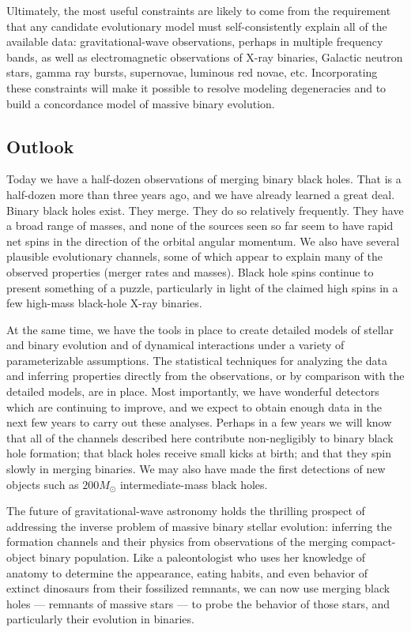 \documentclass[iop,onecolumn]{revtex4-1}
\begin{document}
Ultimately, the most useful constraints are likely to come from the requirement that any candidate evolutionary model must self-consistently explain all of the available data: gravitational-wave observations, perhaps in multiple frequency bands, as well as electromagnetic observations of X-ray binaries, Galactic neutron stars, gamma ray bursts, supernovae, luminous red novae, etc. Incorporating these constraints will make it possible to resolve modeling degeneracies and to build a concordance model of massive binary evolution.  

\subsection{Outlook}

Today we have a half-dozen observations of merging binary black holes.  That is a half-dozen more than three years ago, and we have already learned a great deal.  Binary black holes exist. They merge. They do so relatively frequently.  They have a broad range of masses, and none of the sources seen so far seem to have rapid net spins in the direction of the orbital angular momentum.  We also have several plausible evolutionary channels, some of which appear to explain many of the observed properties (merger rates and masses). Black hole spins continue to present something of a puzzle, particularly in light of the claimed high spins in a few high-mass black-hole X-ray binaries.

At the same time, we have the tools in place to create detailed models of stellar and binary evolution and of dynamical interactions under a variety of parameterizable assumptions.  The statistical techniques for analyzing the data and inferring properties directly from the observations, or by comparison with the detailed models, are in place.  Most importantly, we have wonderful detectors which are continuing to improve, and we expect to obtain enough data in the next few years to carry out these analyses.  Perhaps in a few years we will know that all of the channels described here contribute non-negligibly to binary black hole formation; that black holes receive small kicks at birth; and that they spin slowly in merging binaries. We may also have made the first detections of new objects such as $200 M_\odot$ intermediate-mass black holes.

The future of gravitational-wave astronomy holds the thrilling prospect of addressing the inverse problem of massive binary stellar evolution: inferring the formation channels and their physics from observations of the merging compact-object binary population.  Like a paleontologist who uses her knowledge of anatomy to determine the appearance, eating habits, and even behavior of extinct dinosaurs from their fossilized remnants, we can now use merging black holes --- remnants of massive stars --- to probe the behavior of those stars, and particularly their evolution in binaries.
\end{document}
